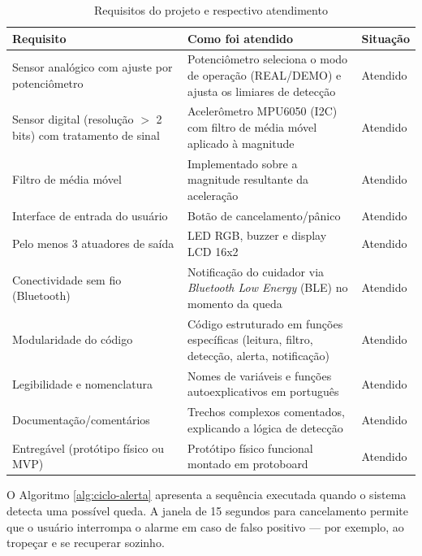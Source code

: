 \begin{table}[H]
\centering
\footnotesize
\caption{Requisitos do projeto e respectivo atendimento}
\label{tab:requisitos}
\begin{tabular}{|p{4.2cm}|p{6.8cm}|p{1.8cm}|}
\hline
\textbf{Requisito} & \textbf{Como foi atendido} & \textbf{Situação} \\
\hline
Sensor analógico com ajuste por potenciômetro & Potenciômetro seleciona o modo de operação (REAL/DEMO) e ajusta os limiares de detecção & Atendido \\
\hline
Sensor digital (resolução $>$ 2 bits) com tratamento de sinal & Acelerômetro MPU6050 (I2C) com filtro de média móvel aplicado à magnitude & Atendido \\
\hline
Filtro de média móvel & Implementado sobre a magnitude resultante da aceleração & Atendido \\
\hline
Interface de entrada do usuário & Botão de cancelamento/pânico & Atendido \\
\hline
Pelo menos 3 atuadores de saída & LED RGB, buzzer e display LCD 16x2 & Atendido \\
\hline
Conectividade sem fio (Bluetooth) & Notificação do cuidador via \textit{Bluetooth Low Energy} (BLE) no momento da queda & Atendido \\
\hline
Modularidade do código & Código estruturado em funções específicas (leitura, filtro, detecção, alerta, notificação) & Atendido \\
\hline
Legibilidade e nomenclatura & Nomes de variáveis e funções autoexplicativos em português & Atendido \\
\hline
Documentação/comentários & Trechos complexos comentados, explicando a lógica de detecção & Atendido \\
\hline
Entregável (protótipo físico ou MVP) & Protótipo físico funcional montado em protoboard & Atendido \\
\hline
\end{tabular}
\end{table}

O Algoritmo \ref{alg:ciclo-alerta} apresenta a sequência executada quando o sistema detecta uma possível queda. A janela de 15 segundos para cancelamento permite que o usuário interrompa o alarme em caso de falso positivo --- por exemplo, ao tropeçar e se recuperar sozinho.

